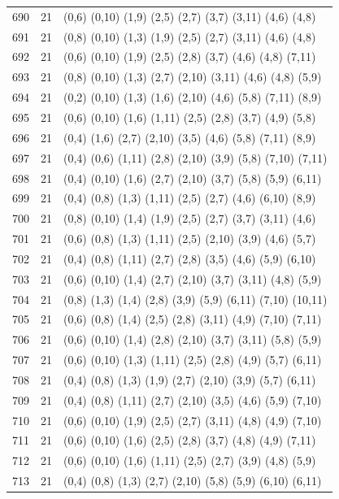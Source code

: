 {\begin{longtable}{lll}
690 & 21 & (0,6) (0,10) (1,9) (2,5) (2,7) (3,7) (3,11) (4,6) (4,8) \\
691 & 21 & (0,8) (0,10) (1,3) (1,9) (2,5) (2,7) (3,11) (4,6) (4,8) \\
692 & 21 & (0,6) (0,10) (1,9) (2,5) (2,8) (3,7) (4,6) (4,8) (7,11) \\
693 & 21 & (0,8) (0,10) (1,3) (2,7) (2,10) (3,11) (4,6) (4,8) (5,9) \\
694 & 21 & (0,2) (0,10) (1,3) (1,6) (2,10) (4,6) (5,8) (7,11) (8,9) \\
695 & 21 & (0,6) (0,10) (1,6) (1,11) (2,5) (2,8) (3,7) (4,9) (5,8) \\
696 & 21 & (0,4) (1,6) (2,7) (2,10) (3,5) (4,6) (5,8) (7,11) (8,9) \\
697 & 21 & (0,4) (0,6) (1,11) (2,8) (2,10) (3,9) (5,8) (7,10) (7,11) \\
698 & 21 & (0,4) (0,10) (1,6) (2,7) (2,10) (3,7) (5,8) (5,9) (6,11) \\
699 & 21 & (0,4) (0,8) (1,3) (1,11) (2,5) (2,7) (4,6) (6,10) (8,9) \\
700 & 21 & (0,8) (0,10) (1,4) (1,9) (2,5) (2,7) (3,7) (3,11) (4,6) \\
701 & 21 & (0,6) (0,8) (1,3) (1,11) (2,5) (2,10) (3,9) (4,6) (5,7) \\
702 & 21 & (0,4) (0,8) (1,11) (2,7) (2,8) (3,5) (4,6) (5,9) (6,10) \\
703 & 21 & (0,6) (0,10) (1,4) (2,7) (2,10) (3,7) (3,11) (4,8) (5,9) \\
704 & 21 & (0,8) (1,3) (1,4) (2,8) (3,9) (5,9) (6,11) (7,10) (10,11) \\
705 & 21 & (0,6) (0,8) (1,4) (2,5) (2,8) (3,11) (4,9) (7,10) (7,11) \\
706 & 21 & (0,6) (0,10) (1,4) (2,8) (2,10) (3,7) (3,11) (5,8) (5,9) \\
707 & 21 & (0,6) (0,10) (1,3) (1,11) (2,5) (2,8) (4,9) (5,7) (6,11) \\
708 & 21 & (0,4) (0,8) (1,3) (1,9) (2,7) (2,10) (3,9) (5,7) (6,11) \\
709 & 21 & (0,4) (0,8) (1,11) (2,7) (2,10) (3,5) (4,6) (5,9) (7,10) \\
710 & 21 & (0,6) (0,10) (1,9) (2,5) (2,7) (3,11) (4,8) (4,9) (7,10) \\
711 & 21 & (0,6) (0,10) (1,6) (2,5) (2,8) (3,7) (4,8) (4,9) (7,11) \\
712 & 21 & (0,6) (0,10) (1,6) (1,11) (2,5) (2,7) (3,9) (4,8) (5,9) \\
713 & 21 & (0,4) (0,8) (1,3) (2,7) (2,10) (5,8) (5,9) (6,10) (6,11) \\

\end{longtable}}
